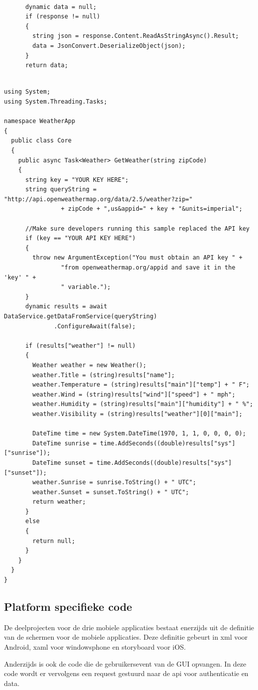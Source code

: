 \begin{lstlisting}

      dynamic data = null;
      if (response != null)
      {
        string json = response.Content.ReadAsStringAsync().Result;
        data = JsonConvert.DeserializeObject(json);
      }
      return data;


\end{lstlisting}
\begin{lstlisting}
using System;
using System.Threading.Tasks;

namespace WeatherApp
{
  public class Core
  {
    public async Task<Weather> GetWeather(string zipCode)
    {
      string key = "YOUR KEY HERE";
      string queryString = "http://api.openweathermap.org/data/2.5/weather?zip="
                + zipCode + ",us&appid=" + key + "&units=imperial";

      //Make sure developers running this sample replaced the API key
      if (key == "YOUR API KEY HERE")
      {
        throw new ArgumentException("You must obtain an API key " +
                "from openweathermap.org/appid and save it in the 'key' " +
                " variable.");
      }
      dynamic results = await DataService.getDataFromService(queryString)
              .ConfigureAwait(false);

      if (results["weather"] != null)
      {
        Weather weather = new Weather();
        weather.Title = (string)results["name"];
        weather.Temperature = (string)results["main"]["temp"] + " F";
        weather.Wind = (string)results["wind"]["speed"] + " mph";
        weather.Humidity = (string)results["main"]["humidity"] + " %";
        weather.Visibility = (string)results["weather"][0]["main"];

        DateTime time = new System.DateTime(1970, 1, 1, 0, 0, 0, 0);
        DateTime sunrise = time.AddSeconds((double)results["sys"]["sunrise"]);
        DateTime sunset = time.AddSeconds((double)results["sys"]["sunset"]);
        weather.Sunrise = sunrise.ToString() + " UTC";
        weather.Sunset = sunset.ToString() + " UTC";
        return weather;
      }
      else
      {
        return null;
      }
    }
  }
}
\end{lstlisting}

\subsection{Platform specifieke code}
De deelprojecten voor de drie mobiele applicaties bestaat enerzijds uit de definitie van de schermen voor de mobiele applicaties.
Deze definitie gebeurt in xml voor Android, xaml voor windowsphone en storyboard voor iOS.

Anderzijds is ook de code die de gebruikersevent van de GUI opvangen. In deze code wordt er vervolgens een request gestuurd naar
de api voor authenticatie en data.
